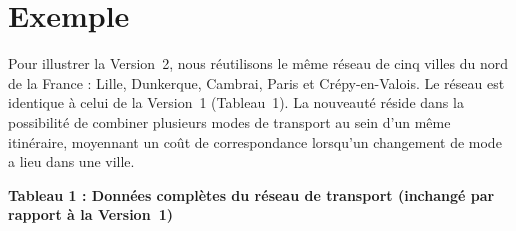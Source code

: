 \documentclass[fontsize=10pt,oneside,parskip=half]{scrreprt}
\begin{document}
\section{Exemple}

Pour illustrer la Version~2, nous réutilisons le même réseau de cinq villes du nord
de la France : Lille, Dunkerque, Cambrai, Paris et Crépy-en-Valois. Le réseau est
identique à celui de la Version~1 (Tableau~1). La nouveauté réside dans la possibilité
de combiner plusieurs modes de transport au sein d'un même itinéraire, moyennant un
coût de correspondance lorsqu'un changement de mode a lieu dans une ville.

\noindent\textbf{Tableau 1 : Données complètes du réseau de transport (inchangé par
rapport à la Version~1)}
\end{document}

